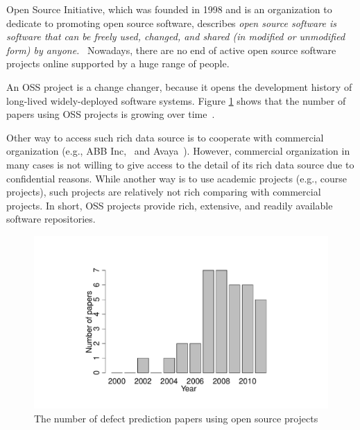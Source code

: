 \begin{oframed}
\vspace{-0.2cm}
Open Source Initiative, which was founded in 1998 and is an organization to dedicate to promoting open source software, describes \emph{open source software is software that can be freely used, changed, and shared (in modified or unmodified form) by anyone.}~\cite{OSI}
Nowadays, there are no end of active open source software projects online supported by a huge range of people.

An OSS project is a change changer, because it opens the development history of long-lived widely-deployed software systems.
Figure \ref{fig:oss} shows that the number of papers using OSS projects is growing over time~\cite{Shihab2012PhD}. 

Other way to access such rich data source is to cooperate with commercial organization (e.g., ABB Inc,~\cite{Li2006} and Avaya~\cite{Mockus2010FSE}).
However, commercial organization in many cases is not willing to give access to the detail of its rich data source due to confidential reasons.
While another way is to use academic projects (e.g., course projects), such projects are relatively not rich comparing with commercial projects.
In short, OSS projects provide rich, extensive, and readily available software repositories. 
\end{oframed}

\begin{figure}
  \centering
  \includegraphics[trim=100 30 100 0, scale=0.5,clip]{figures/papers}
  \caption{The number of defect prediction papers using open source projects \label{fig:oss}}
\end{figure}


